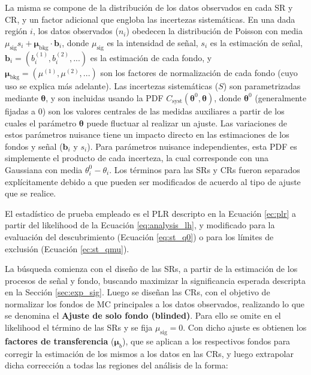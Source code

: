 La misma se compone de la distribución de los datos observados en cada SR y CR, y un factor adicional que engloba las incertezas sistemáticas. En una dada región $i$, los datos observados ($n_i$) obedecen la distribución de Poisson con media $\mu_\text{sig} s_i + \bm{\mu}_{\text{bkg}} \cdot \textbf{b}_i$, donde $\mu_\text{sig}$ es la intensidad de señal, $s_i$ es la estimación de señal, $\textbf{b}_i = (b_i^{(1)}, b_i^{(2)}, ...)$ es la estimación de cada fondo, y $\bm{\mu}_{\text{bkg}} = (\mu^{(1)}, \mu^{(2)}, ...)$ son los factores de normalización de cada fondo (cuyo uso se explica más adelante). Las incertezas sistemáticas ($S$) son parametrizadas mediante $\bm{\theta}$, y son incluidas usando la PDF $C_\text{syst} (\bm{\theta}^0, \bm{\theta})$, donde $\bm{\theta}^0$ (generalmente fijadas a 0) son los valores centrales de las medidas auxiliares a partir de los cuales el parámetro $\bm{\theta}$ puede fluctuar al realizar un ajuste. Las variaciones de estos parámetros nuisance tiene un impacto directo en las estimaciones de los fondos y señal ($\textbf{b}_i$ y $s_i$). Para parámetros nuisance independientes, esta PDF es simplemente el producto de cada incerteza, la cual corresponde con una Gaussiana con media $\theta_i^0 - \theta_i$. Los términos para las SRs y CRs fueron separados explícitamente debido a que pueden ser modificados de acuerdo al tipo de ajuste que se realice. 

El estadístico de prueba empleado es el PLR descripto en la Ecuación \ref{ec:plr} a partir del likelihood de la Ecuación \ref{eq:analysis_lh}, y modificado para la evaluación del descubrimiento (Ecuación \ref{eq:st_q0}) o para los límites de exclusión (Ecuación \ref{ec:st_qmu}).

La búsqueda comienza con el diseño de las SRs, a partir de la estimación de los procesos de señal y fondo, buscando maximizar la significancia esperada descripta en la Sección \ref{sec:exp_sig}. Luego se diseñan las CRs, con el objetivo de normalizar los fondos de MC principales a los datos observados, realizando lo que se denomina el \textbf{Ajuste de solo fondo (blinded)}. Para ello se omite en el likelihood el término de las SRs y se fija $\mu_\text{sig}=0$. Con dicho ajuste es obtienen los \textbf{factores de transferencia} ($\bm{\mu}_b$), que se aplican a los respectivos fondos para corregir la estimación de los mismos a los datos en las CRs, y luego extrapolar dicha corrección a todas las regiones del análisis de la forma:


